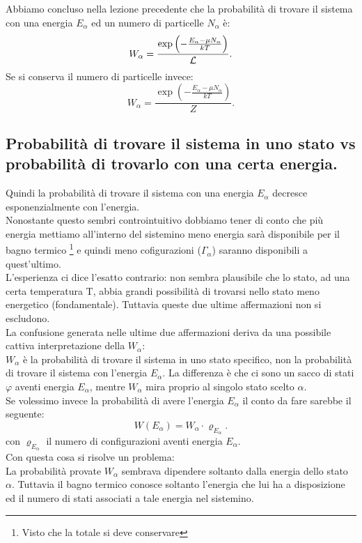 
Abbiamo concluso nella lezione precedente che la probabilità di trovare il sistema con una energia $E_{\alpha}$ ed un numero di particelle $N_{\alpha}$ è:
\[
	W_{\alpha} = \frac{\exp\left(- \frac{E_{\alpha}-\mu N_{\alpha}}{kT} \right) }{\mathcal{L}}
.\] 
Se si conserva il numero di particelle invece:
\[
	W_{\alpha} = \frac{\exp(-\frac{E_{\alpha}-\mu N_{\alpha}}{kT})}{Z}
.\] 
\subsection{Probabilità di trovare il sistema in uno stato vs probabilità di trovarlo con una certa energia.}%
Quindi la probabilità di trovare il sistema con una energia $E_{\alpha}$ decresce esponenzialmente con l'energia. \\
Nonostante questo sembri controintuitivo dobbiamo tener di conto che più energia mettiamo all'interno del sistemino meno energia sarà disponibile per il bagno termico \footnote{Visto che la totale si deve conservare} e quindi meno cofigurazioni ($\Gamma_{\alpha}$) saranno disponibili a quest'ultimo. \\
L'esperienza ci dice l'esatto contrario: non sembra plausibile che lo stato, ad una certa temperatura T, abbia grandi possibilità di trovarsi nello stato meno energetico (fondamentale). Tuttavia queste due ultime affermazioni non si escludono.\\
La confusione generata nelle ultime due affermazioni deriva da una possibile cattiva interpretazione della $W_{\alpha}$:\\
 $W_{\alpha}$ è la probabilità di trovare il sistema in uno stato specifico, non la probabilità di trovare il sistema con l'energia $E_{\alpha}$. La differenza è che ci sono un sacco di stati $\varphi$ aventi energia $E_{\alpha}$, mentre $W_{\alpha}$ mira proprio al singolo stato scelto $\alpha$. \\
Se volessimo invece la probabilità di avere l'energia $E_{\alpha}$ il conto da fare sarebbe il seguente:
\[
	W\left( E_{\alpha} \right) = W_{\alpha}\cdot \varrho_{E_{\alpha}}
.\] 
con $\varrho_{E_{\alpha}}$  il numero di configurazioni aventi energia  $E_{\alpha}$.\\
Con questa cosa si risolve un problema:\\
La probabilità provate $W_{\alpha}$ sembrava dipendere soltanto dalla energia dello stato $\alpha$. Tuttavia il bagno termico conosce soltanto l'energia che lui ha a disposizione ed il numero di stati associati a tale energia nel sistemino.\\
